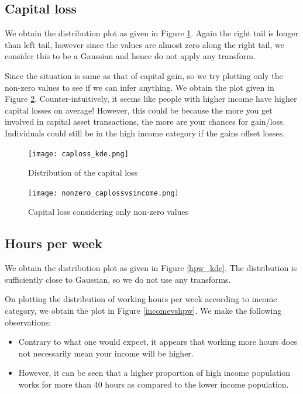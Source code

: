 \documentclass[conference]{IEEEtran}
\begin{document}
\subsection*{Capital loss}

We obtain the distribution plot as given in Figure \ref{caploss_kde}. Again the right tail is longer than left tail, however since the values are almost zero along the right tail, we consider this to be a Gaussian and hence do not apply any transform.

 Since the situation is same as that of capital gain, so we try plotting only the non-zero values to see if we can infer anything. We obtain the plot given in Figure \ref{nonzero_caplossvsincome}. Counter-intuitively, it seems like people with higher income have higher capital losses on average!  However, this could be because the more you get involved in capital asset transactions, the more are your chances for gain/loss. Individuals could still be in the high income category if the gains offset losses.


\begin{figure}[tbh]
\centering
\texttt{[image: caploss\_kde.png]}
\caption{Distribution of the capital loss}
\label{caploss_kde}
\end{figure}


\begin{figure}[tbh]
\centering
\texttt{[image: nonzero\_caplossvsincome.png]}
\caption{Capital loss considering only non-zero values}
\label{nonzero_caplossvsincome}
\end{figure}

\subsection*{Hours per week}

We obtain the distribution plot as given in Figure \ref{hpw_kde}. The distribution is sufficiently close to Gaussian, so we do not use any transforms.

On plotting the distribution of working hours per week according to income category, we obtain the plot in Figure \ref{incomevshpw}. We make the following observations:

\begin{itemize}
    \item Contrary to what one would expect, it appears that working more hours does not necessarily mean your income will be higher.
    \item However, it can be seen that a higher proportion of high income population works for more than 40 hours as compared to the lower income population.
\end{itemize}
\end{document}
